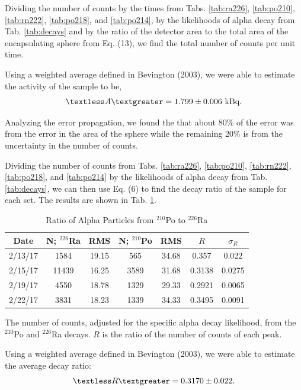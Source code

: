 \documentclass[10pt]{IEEEtran}
\begin{document}
Dividing the number of counts by the times from Tabs. \ref{tab:ra226}, \ref{tab:po210}, \ref{tab:rn222}, \ref{tab:po218}, and \ref{tab:po214}, by the likelihoods of alpha decay from Tab. \ref{tab:decays} and by the ratio of the detector area to the total area of the encapsulating sphere from Eq. (13), we find the total number of counts per unit time. 

Using a weighted average defined in Bevington (2003), we were able to estimate the activity of the sample to be,
	\begin{equation}
		\textless A\textgreater = 1.799\pm0.006\text{ kBq}.
	\end{equation}
	
Analyzing the error propagation, we found the that about 80\% of the error was from the error in the area of the sphere while the remaining 20\% is from the uncertainty in the number of counts.

Dividing the number of counts from Tabs. \ref{tab:ra226}, \ref{tab:po210}, \ref{tab:rn222}, \ref{tab:po218}, and \ref{tab:po214} by the likelihoods of alpha decay from Tab. \ref{tab:decays}, we can then use Eq. (6) to find the decay ratio of the sample for each set. The results are shown in Tab. \ref{tab:R}.

     \begin{table}[!h]
        \begin{center}
        \caption{Ratio of Alpha Particles from $^{210}$Po to $^{226}$Ra}
        \label{tab:R}
        \begin{tabular}{|c|c|c|c|c|c|c|}
            \hline
            Date & N; $^{226}$Ra & RMS & N; $^{210}$Po & RMS & $R$ & $\sigma_R$ \\
            \hline
            2/13/17 & 1584 & 19.15 & 565 & 34.68 & 0.357 & 0.022 \\
            \hline
            2/15/17 & 11439 & 16.25 & 3589 & 31.68 & 0.3138 & 0.0275\\
            \hline
            2/19/17 & 4550 & 18.78 & 1329 & 29.33 & 0.2921 & 0.0065 \\
            \hline
            2/22/17 & 3831 & 18.23 & 1339 & 34.33 & 0.3495 & 0.0091 \\
            \hline
        \end{tabular}
        \end{center}
The number of counts, adjusted for the specific alpha decay likelihood, from the $^{210}$Po and $^{226}$Ra decays. $R$ is the ratio of the number of counts of each peak. 
    \end{table}
Using a weighted average defined in Bevington (2003), we were able to estimate the average decay ratio:
	\begin{equation}
		\textless R\textgreater = 0.3170\pm0.022.
	\end{equation}
\end{document}
